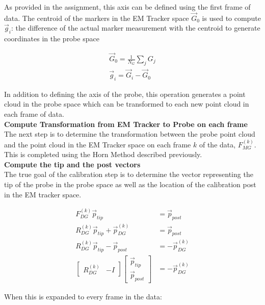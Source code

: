 \documentclass[letterpaper, 11pt]{report}
\begin{document}
As provided in the assignment, this axis can be defined using the first frame of data. The centroid of the markers in the EM Tracker space $\vec G_0$ is used to compute $\vec g_i$: the difference of the actual marker measurement with the centroid to generate coordinates in the probe space

\begin{align*}
	\vec G_0 = \frac{1}{N_G}\sum_j G_j \\
    \vec g_i = \vec G_i - \vec G_0 
\end{align*}

In addition to defining the axis of the probe, this operation generates a point cloud in the probe space which can be transformed to each new point cloud in each frame of data.
\\

\textbf{Compute Transformation from EM Tracker to Probe on each frame}\\
The next step is to determine the transformation between the probe point cloud and the point cloud in the EM Tracker space on each frame $k$ of the data, $F_{MG}^{(k)}$. This is completed using the Horn Method described previously. 
\\

\textbf{Compute the tip and the post vectors}\\
The true goal of the calibration step is to determine the vector representing the tip of the probe in the probe space as well as the location of the calibration post in the EM tracker space.

\begin{align*}
	F_{DG}^{(k)} \vec p_{tip} &= \vec p_{post}  \\
    R_{DG}^{(k)} \vec p_{tip} + \vec p_{DG}^{(k)} &=  \vec p_{post}\\
    R_{DG}^{(k)} \vec p_{tip} - \vec p_{post} &= -\vec p_{DG}^{(k)} \\
    \begin{bmatrix}
    	R_{DG}^{(k)} & -I
    \end{bmatrix} \begin{bmatrix}
    					\vec p_{tip} \\
                        \vec p_{post}
                   \end{bmatrix} &= -\vec p_{DG}^{(k)}
\end{align*}

When this is expanded to every frame in the data:
\end{document}
